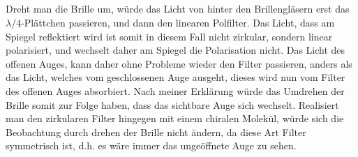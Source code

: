 \documentclass[ex]{exercise}
\begin{document}
\subsection{}
Dreht man die Brille um, würde das Licht von hinter den Brillengläsern erst das \(\lambda/4\)-Plättchen 
passieren, und dann den linearen Polfilter. Das Licht, dass am Spiegel reflektiert wird ist somit
in diesem Fall nicht zirkular, sondern linear polarisiert, und wechselt daher am Spiegel die Polarisation nicht.
Das Licht des offenen Auges, kann daher ohne Probleme wieder den Filter passieren, 
anders als das Licht, welches vom geschlossenen Auge ausgeht, dieses wird nun vom Filter des offenen Auges absorbiert.
Nach meiner Erklärung würde das Umdrehen der Brille somit zur Folge haben, dass das sichtbare Auge sich 
wechselt. Realisiert man den zirkularen Filter hingegen mit einem chiralen Molekül, würde 
sich die Beobachtung durch drehen der Brille nicht ändern, da diese Art Filter symmetrisch ist, d.h. es wäre 
immer das ungeöffnete Auge zu sehen. 
\end{document}
